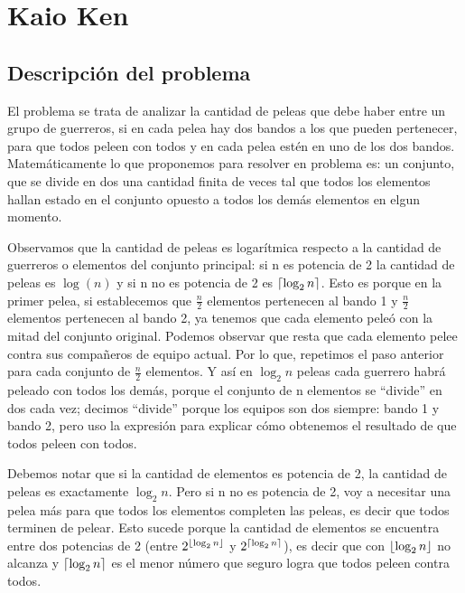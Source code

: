 




\section{Kaio Ken}

\subsection{Descripción del problema}
\par{El problema se trata de analizar la cantidad de peleas que debe haber entre un grupo de
guerreros, si en cada pelea hay dos bandos a los que pueden pertenecer, para que todos
peleen con todos y en cada pelea estén en uno de los dos bandos. Matemáticamente lo que
proponemos para resolver en problema es: un conjunto, que se divide en dos una cantidad
finita de veces tal que todos los elementos hallan estado en el conjunto opuesto a todos
los demás elementos en elgun momento.}
\par{Observamos que la cantidad de peleas es logarítmica respecto a la cantidad de guerreros o elementos del conjunto principal: si n es potencia de 2 la cantidad de peleas es $\log(n)$ y si n no es potencia de 2 es $\ceil*{\log_2 n}$. Esto es porque en la primer pelea, si establecemos que $\frac{n}{2}$ elementos pertenecen al bando 1 y $\frac{n}{2}$ elementos pertenecen al bando 2, ya tenemos que cada elemento peleó con la mitad del conjunto original. Podemos observar que resta que cada elemento pelee contra sus compañeros de equipo actual. Por lo que, repetimos el paso anterior para cada conjunto de $\frac{n}{2}$ elementos. Y así en $\log_2 n$ peleas cada guerrero habrá peleado con todos los demás, porque el conjunto de n elementos se “divide” en dos cada vez; decimos “divide” porque los equipos son dos siempre: bando 1 y bando 2, pero uso la expresión para explicar cómo obtenemos el resultado de que todos peleen con todos.}
\par{Debemos notar que si la cantidad de elementos es potencia de 2, la cantidad de peleas es exactamente $\log_2 n$. Pero si n no es potencia de 2, voy a necesitar una pelea más para que todos los elementos completen las peleas, es decir que todos terminen de pelear. Esto sucede porque la cantidad de elementos se encuentra entre dos
potencias de 2 (entre $2^{\floor*{\log_2 n}}$ y $2^{\ceil*{\log_2 n}}$), es decir que con ${\floor*{\log_2 n}}$ no alcanza y ${\ceil*{\log_2 n}}$ es el menor número que seguro logra que todos peleen contra todos.}


